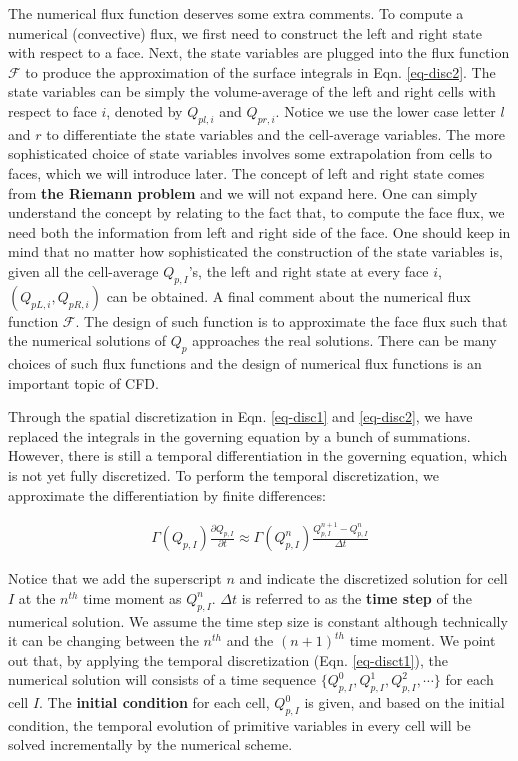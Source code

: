 \documentclass[12pt, letterpaper]{report}
\begin{document}
The numerical flux function deserves some extra comments. To compute a numerical (convective) flux,
we first need to construct the left and right state with respect to a face. Next, the state
variables are plugged into the flux function $\mathcal{F}$ to produce the approximation of the
surface integrals in Eqn.  \ref{eq-disc2}.  The state variables can be simply the volume-average of
the left and right cells with respect to face $i$, denoted by $Q_{pl,i}$ and $Q_{pr,i}$. Notice we
use the lower case letter $l$ and $r$ to differentiate the state variables and the cell-average
variables. The more sophisticated choice of state variables involves some extrapolation from cells
to faces, which we will introduce later. The concept of left and right state comes from {\bf the
Riemann problem} \cite{toro2013riemann} and we will not expand here.  One can simply understand the
concept by relating to the fact that, to compute the face flux, we need both the information from
left and right side of the face. One should keep in mind that no matter how sophisticated the
construction of the state variables is, given all the cell-average $Q_{p,I}$'s, the left and right
state at every face $i$, $(Q_{pL,i}, Q_{pR,i})$ can be obtained. A final comment about the numerical
flux function $\mathcal{F}$. The design of such function is to approximate the face flux such that
the numerical solutions of $Q_p$ approaches the real solutions.  There can be many choices of such
flux functions and the design of numerical flux functions is an important topic of CFD. \paraspace

Through the spatial discretization in Eqn. \ref{eq-disc1} and \ref{eq-disc2}, we have replaced the
integrals in the governing equation by a bunch of summations. However, there is still a temporal
differentiation in the governing equation, which is not yet fully discretized. To perform the
temporal discretization, we approximate the differentiation by finite differences:

\begin{align}\label{eq-disct1}
   \Gamma(Q_{p,I})\frac{\partial Q_{p,I}}{\partial t} \approx \Gamma(Q_{p,I}^n) \frac{Q_{p,I}^{n+1} -
   Q_{p,I}^n}{\Delta t}
\end{align}

Notice that we add the superscript $n$ and indicate the discretized solution for cell $I$ at the
$n^{th}$ time moment as $Q_{p,I}^n$. $\Delta t$ is referred to as the {\bf time step} of the
numerical solution. We assume the time step size is constant although technically it can be changing
between the $n^{th}$ and the $(n+1)^{th}$ time moment. We point out that, by applying the temporal
discretization (Eqn. \ref{eq-disct1}), the numerical solution will consists of a time sequence
$\{Q_{p,I}^0, Q_{p,I}^1, Q_{p,I}^2, \cdots\}$ for each cell $I$. The {\bf initial condition} for
each cell, $Q_{p,I}^0$ is given, and based on the initial condition, the temporal evolution of
primitive variables in every cell will be solved incrementally by the numerical scheme.  \paraspace
\end{document}
